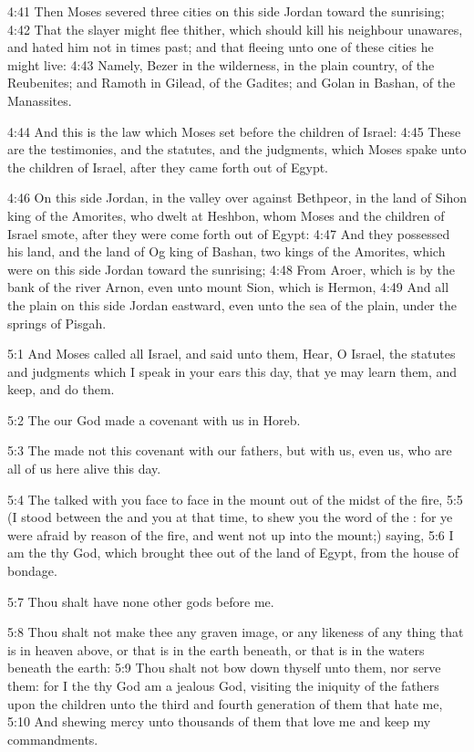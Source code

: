 4:41 Then Moses severed three cities on this side Jordan toward the sunrising; 4:42 That the slayer might flee thither, which should kill his neighbour unawares, and hated him not in times past; and that fleeing unto one of these cities he might live: 4:43 Namely, Bezer in the wilderness, in the plain country, of the Reubenites; and Ramoth in Gilead, of the Gadites; and Golan in Bashan, of the Manassites.

4:44 And this is the law which Moses set before the children of Israel: 4:45 These are the testimonies, and the statutes, and the judgments, which Moses spake unto the children of Israel, after they came forth out of Egypt.

4:46 On this side Jordan, in the valley over against Bethpeor, in the land of Sihon king of the Amorites, who dwelt at Heshbon, whom Moses and the children of Israel smote, after they were come forth out of Egypt: 4:47 And they possessed his land, and the land of Og king of Bashan, two kings of the Amorites, which were on this side Jordan toward the sunrising; 4:48 From Aroer, which is by the bank of the river Arnon, even unto mount Sion, which is Hermon, 4:49 And all the plain on this side Jordan eastward, even unto the sea of the plain, under the springs of Pisgah.

5:1 And Moses called all Israel, and said unto them, Hear, O Israel, the statutes and judgments which I speak in your ears this day, that ye may learn them, and keep, and do them.

5:2 The \LORD our God made a covenant with us in Horeb.

5:3 The \LORD made not this covenant with our fathers, but with us, even us, who are all of us here alive this day.

5:4 The \LORD talked with you face to face in the mount out of the midst of the fire, 5:5 (I stood between the \LORD and you at that time, to shew you the word of the \LORD: for ye were afraid by reason of the fire, and went not up into the mount;) saying, 5:6 I am the \LORD thy God, which brought thee out of the land of Egypt, from the house of bondage.

5:7 Thou shalt have none other gods before me.

5:8 Thou shalt not make thee any graven image, or any likeness of any thing that is in heaven above, or that is in the earth beneath, or that is in the waters beneath the earth: 5:9 Thou shalt not bow down thyself unto them, nor serve them: for I the \LORD thy God am a jealous God, visiting the iniquity of the fathers upon the children unto the third and fourth generation of them that hate me, 5:10 And shewing mercy unto thousands of them that love me and keep my commandments.

